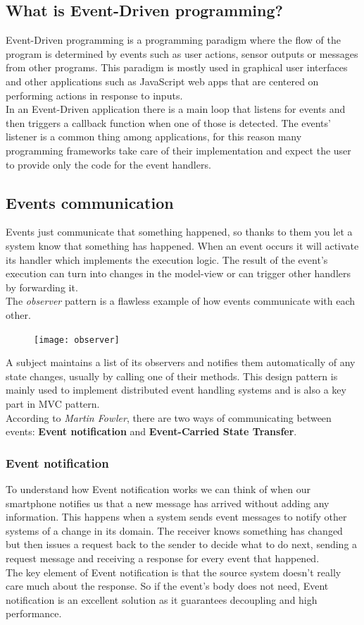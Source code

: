 \documentclass[11pt]{article} %
\begin{document}
\subsection{What is Event-Driven programming?}
Event-Driven programming is a programming paradigm where the flow of the program is determined by events such as user actions, sensor outputs or messages from other programs. This paradigm is mostly used in graphical user interfaces and other applications such as JavaScript web apps that are centered on performing actions in response to inputs. \\
In an Event-Driven application there is a main loop that listens for events and then triggers a callback function when one of those is detected. The events' listener is a common thing among applications, for this reason many programming frameworks take care of their implementation and expect the user to provide only the code for the event handlers.

\subsection{Events communication}
Events just communicate that something happened, so thanks to them you let a system know that something has happened. When an event occurs it will activate its handler which implements the execution logic. The result of the event's execution can turn into changes in the model-view or can trigger other handlers by forwarding it. \\
The \emph{observer} pattern is a flawless example of how events communicate with each other. 
\begin{figure} [H]
	\centering
	\texttt{[image: observer]}
\end{figure}
A subject maintains a list of its  observers and notifies them automatically of any state changes, usually by calling one of their methods.
This design pattern is mainly used to implement distributed event handling systems and is also a key part in MVC pattern.\\ 

According to \emph{Martin Fowler}, there are two ways of communicating between events: \textbf{Event notification} and \textbf{Event-Carried State Transfer}.

\subsubsection{Event notification}
To understand how Event notification works we can think of when our smartphone notifies us that a new message has arrived without adding any information. This happens when a system sends event messages to notify other systems of a change in its domain. The receiver knows something has changed but then issues a request back to the sender to decide what to do next, sending a request message and receiving a response for every event that happened. \\
The key element of Event notification is that the source system doesn't really care much about the response. So if the event's body does not need, Event notification is an excellent solution as it guarantees decoupling and high performance.
\end{document}
